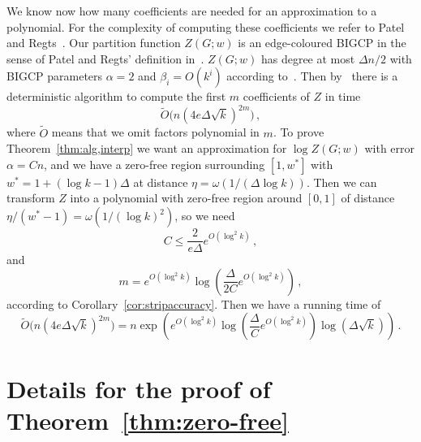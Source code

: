 \documentclass[10pt,a4paper]{article}
\theoremstyle{definition}
\begin{document}
%
%
We know now how many coefficients are needed for an approximation to a polynomial. 
For the complexity of computing these coefficients we refer to Patel and Regts~\cite{PR17,PR19}.
Our partition function $Z(G;w)$ is an edge-coloured BIGCP in the sense of Patel and Regts' definition in~\cite{PR19}.
$Z(G;w)$ has degree at most $\Delta n/2$ with BIGCP parameters $\alpha=2$ and $\beta_i=O(k^i)$ according to~\cite[Section 6]{PR17}.
Then by~\cite[Theorem 2.1]{PR19} there is a deterministic algorithm to compute the first $m$ coefficients of $Z$ in time
\[
\tilde O\big(n(4e\Delta\sqrt k)^{2m}\big)\,,
\]
where $\tilde O$ means that we omit factors polynomial in $m$.
%
To prove Theorem~\ref{thm:alg,interp} we want an approximation for $\log Z(G;w)$ with error $\alpha=C n$, and we have a zero-free region surrounding $[1,w^*]$ with $w^*=1+(\log k-1)\Delta$ at distance $\eta=\omega(1/(\Delta\log k))$. 
Then we can transform $Z$ into a polynomial with zero-free region around $[0,1]$ of distance $\eta/(w^*-1) = \omega(1/(\log k)^2)$, so we need
\[
C  \le \frac{2}{e\Delta}e^{O(\log^2 k)} \,,
\]
and
\[
m = e^{O(\log^2 k)}\log\left(\frac{\Delta}{2C}e^{O(\log^2 k)}\right)\,,
\]
according to Corollary~\ref{cor:stripaccuracy}.
%
Then we have a running time of
\[
\tilde O\big(n(4e\Delta\sqrt k)^{2m}\big)
= n\exp\left(e^{O(\log^2 k)} \log\left(\frac{\Delta}{C}e^{O(\log^2 k)}\right)\log(\Delta\sqrt k)\right)\,.
\]
%

\section{Details for the proof of Theorem~\ref{thm:zero-free}}\label{app:zero-free,details}
\end{document}
